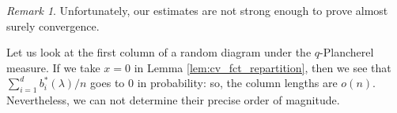 \documentclass[10pt]{amsart}
\theoremstyle{remark}
\newtheorem{remark}{Remark}
\begin{document}


\begin{remark}\label{RemColumns}
Unfortunately, our estimates are not strong enough to prove almost surely convergence.

Let us look at the first column of a random diagram under the $q$-Plancherel measure.
 If we take $x=0$ in Lemma \ref{lem:cv_fct_repartition}, then we see that $\sum_{i=1}^d b_i^*(\lambda)/n$ goes to $0$ in probability: so, the column lengths are $o(n)$. Nevertheless, we can not determine their precise order of magnitude.\bigskip
\end{remark}
\end{document}
